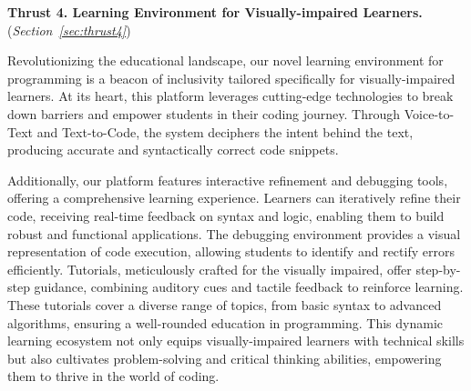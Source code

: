 \vspace{3pt}
\noindent \textbf{Thrust 4. Learning Environment for Visually-impaired Learners.} ({\em Section~\ref{sec:thrust4}})


Revolutionizing the educational landscape, our novel learning
environment for programming is a beacon of inclusivity tailored
specifically for visually-impaired learners. At its heart, this
platform leverages cutting-edge technologies to break down barriers
and empower students in their coding journey.
Through Voice-to-Text and Text-to-Code, the system deciphers the
intent behind the text, producing accurate and syntactically correct
code snippets.

Additionally, our platform features interactive refinement and
debugging tools, offering a comprehensive learning
experience. Learners can iteratively refine their code, receiving
real-time feedback on syntax and logic, enabling them to build robust
and functional applications. The debugging environment provides a
visual representation of code execution, allowing students to identify
and rectify errors efficiently. Tutorials, meticulously crafted for
the visually impaired, offer step-by-step guidance, combining auditory
cues and tactile feedback to reinforce learning. These tutorials cover
a diverse range of topics, from basic syntax to advanced algorithms,
ensuring a well-rounded education in programming. This dynamic
learning ecosystem not only equips visually-impaired learners with
technical skills but also cultivates problem-solving and critical
thinking abilities, empowering them to thrive in the world of
coding.

